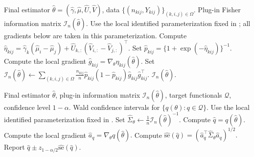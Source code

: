 \documentclass{article}
\begin{document}
\begin{bibunit}[unsrtnat]
\begin{algorithm}[!ht]
\caption{\textsc{EstimateFisherInfo}: plug-in Fisher information}
\label{alg:covariance}
\begin{algorithmic}[1]
\Require Final estimator \(\widehat\theta=(\widehat\gamma,\widehat\mu,\widehat U,\widehat V)\), data \(\{(n_{kij},Y_{kij})\}_{(k,i,j)\in\Omega}\).
\Ensure Plug-in Fisher information matrix \(\mathcal I_n(\widehat\theta)\).
\State Use the local identified parameterization fixed in ; all gradients below are taken in this parameterization.
    \State Compute
    \(
        \widehat\eta_{kij}
        =
        \widehat\gamma_k(\widehat\mu_i-\widehat\mu_j)
        +
        \widehat U_{k,:}(\widehat V_{i,:}-\widehat V_{j,:})^\top .
    \)
    \State Set
    \(
        \widehat p_{kij}
        =
        \{1+\exp(-\widehat\eta_{kij})\}^{-1}.
    \)
    \State Compute the local gradient
    \(
        \widehat g_{kij}
        =
        \nabla_\theta \eta_{kij}(\widehat\theta).
    \)
\EndFor
\State Set
\(
    \mathcal I_n(\widehat\theta)
    \gets
    \sum_{(k,i,j)\in\Omega}
    \frac{n_{kij}}{n}
    \widehat p_{kij}(1-\widehat p_{kij})
    \widehat g_{kij}\widehat g_{kij}^{\top}.
\)
\State \Return \(\mathcal I_n(\widehat\theta)\).
\end{algorithmic}
\end{algorithm}

\begin{algorithm}[!ht]
\caption{\textsc{UncertaintyQuantification}: delta-method confidence intervals}
\label{alg:uq}
\begin{algorithmic}[1]
\Require Final estimator \(\widehat\theta\), plug-in information matrix \(\mathcal I_n(\widehat\theta)\), target functionals \(\mathcal Q\), confidence level \(1-\alpha\).
\Ensure Wald confidence intervals for \(\{q(\theta):q\in\mathcal Q\}\).
\State Use the local identified parameterization fixed in .
\State Set
\(
    \widehat\Sigma_{\theta}
    \gets
    \frac{1}{n}\mathcal I_n(\widehat\theta)^{-1}.
\)
    \State Compute \(\widehat q=q(\widehat\theta)\).
    \State Compute the local gradient
    \(
        \widehat a_q
        =
        \nabla_\theta q(\widehat\theta).
    \)
    \State Compute
    \(
        \widehat{\mathrm{se}}(\widehat q)
        =
        \left(
        \widehat a_q^\top
        \widehat\Sigma_{\theta}
        \widehat a_q
        \right)^{1/2}.
    \)
    \State Report
    \(
        \widehat q
        \pm
        z_{1-\alpha/2}\widehat{\mathrm{se}}(\widehat q).
    \)
\EndFor
\end{algorithmic}
\end{algorithm}




\end{bibunit}
\end{document}
